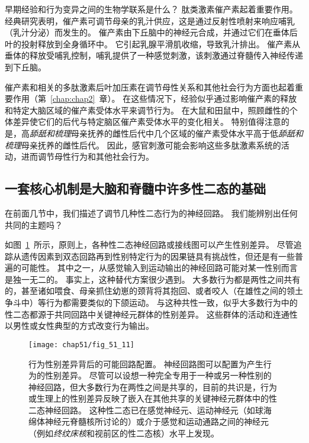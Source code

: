 早期经验和行为变异之间的生物学联系是什么？
肽类激素催产素起着重要作用。
经典研究表明，催产素可调节母亲的乳汁供应，这是通过反射性喷射来响应哺乳（乳汁分泌）而发生的。
催产素由下丘脑中的神经元合成，并通过它们在垂体后叶的投射释放到全身循环中。
它引起乳腺平滑肌收缩，导致乳汁排出。
催产素从垂体的释放受哺乳控制，哺乳提供了一种感觉刺激，该刺激通过脊髓传入神经传递到下丘脑。


催产素和相关的多肽激素后叶加压素在调节母性关系和其他社会行为方面也起着重要作用（第~\ref{chap:chap2}~章）。
在这些情况下，经验似乎通过影响催产素的释放和特定大脑区域的催产素受体水平来调节行为。
在大鼠和田鼠中，照顾雌性的个体差异使它们的后代与特定脑区催产素受体水平的变化相关。
特别值得注意的是，高\textit{舔舐和梳理}母亲抚养的雌性后代中几个区域的催产素受体水平高于低\textit{舔舐和梳理}母亲抚养的雌性后代。
因此，感官刺激可能会影响这些多肽激素系统的活动，进而调节母性行为和其他社会行为。



\subsection{一套核心机制是大脑和脊髓中许多性二态的基础}

在前面几节中，我们描述了调节几种性二态行为的神经回路。
我们能辨别出任何共同的主题吗？


如图~\ref{fig:51_11}~所示，原则上，各种性二态神经回路或接线图可以产生性别差异。
尽管追踪从遗传因素到双态回路再到性别特定行为的因果链具有挑战性，但还是有一些普遍的可能性。 
其中之一，从感觉输入到运动输出的神经回路可能对某一性别而言是独一无二的。
事实上，这种替代方案很少遇到。
大多数行为都是两性之间共有的，甚至诸如喂食、母亲抓住幼崽的颈背将其抱回、或者咬人（在雄性之间的领土争斗中）等行为都需要类似的下颌运动。
与这种共性一致，似乎大多数行为中的性二态都源于共同回路中关键神经元群体的性别差异。
这些群体的活动和连通性以男性或女性典型的方式改变行为输出。


\begin{figure}[htbp]
	\centering
	\texttt{[image: chap51/fig\_51\_11]}
	\caption{行为性别差异背后的可能回路配置。
		神经回路图可以配置为产生行为的性别差异。
		尽管可以设想一种完全专用于一种或另一种性别的神经回路，但大多数行为在两性之间是共享的，目前的共识是，行为或生理上的性别差异反映了嵌入在其他共享的关键神经元群体中的性二态神经回路。
		这种性二态已在感觉神经元、运动神经元（如球海绵体神经元脊髓核所讨论的）或介于感觉和运动通路之间的神经元（例如\textit{终纹床核}和视前区的性二态核）水平上发现。}
	\label{fig:51_11}
\end{figure}


